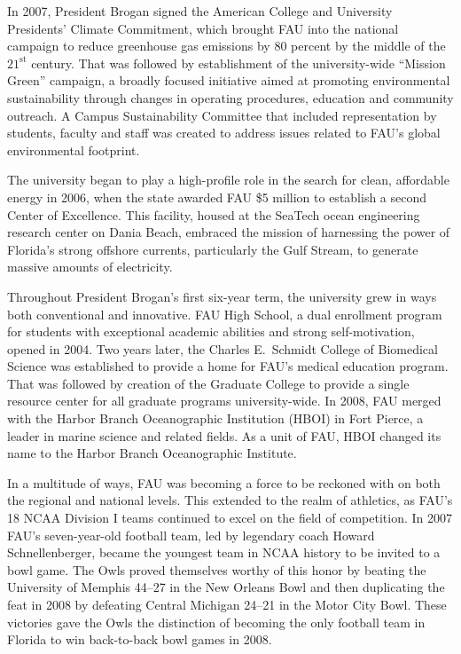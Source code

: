\documentclass{article}
\begin{document}
In 2007, President Brogan signed the American College and University Presidents' Climate Commitment, which brought FAU into the national campaign to reduce greenhouse gas emissions by 80 percent by the middle of the $21^{\mathrm{st}}$ century.  That was followed by establishment of the university-wide ``Mission Green'' campaign, a broadly focused initiative aimed at promoting environmental sustainability through changes in operating procedures, education and community outreach.  A Campus Sustainability Committee that included representation by students, faculty and staff was created to address issues related to FAU's global environmental footprint.

The university began to play a high-profile role in the search for clean, affordable energy in 2006, when the state awarded FAU \$5 million to establish a second Center of Excellence.  This facility, housed at the SeaTech ocean engineering research center on Dania Beach, embraced the mission of harnessing the power of Florida's strong offshore currents, particularly the Gulf Stream, to generate massive amounts of electricity.

Throughout President Brogan's first six-year term, the university grew in ways both conventional and innovative.  FAU High School, a dual enrollment program for students with exceptional academic abilities and strong self-motivation, opened in 2004.  Two years later, the Charles E.\ Schmidt College of Biomedical Science was established to provide a home for FAU's medical education program.  That was followed by creation of the Graduate College to provide a single resource center for all graduate programs university-wide.  In 2008, FAU merged with the Harbor Branch Oceanographic Institution (HBOI) in Fort Pierce, a leader in marine science and related fields.  As a unit of FAU, HBOI changed its name to the Harbor Branch Oceanographic Institute.

In a multitude of ways, FAU was becoming a force to be reckoned with on both the regional and national levels.  This extended to the realm of athletics, as FAU's 18 NCAA Division I teams continued to excel on the field of competition.  In 2007 FAU's seven-year-old football team, led by legendary coach Howard Schnellenberger, became the youngest team in NCAA history to be invited to a bowl game.  The Owls proved themselves worthy of this honor by beating the University of Memphis 44--27 in the New Orleans Bowl and then duplicating the feat in 2008 by defeating Central Michigan 24--21 in the Motor City Bowl.  These victories gave the Owls the distinction of becoming the only football team in Florida to win back-to-back bowl games in 2008.
\end{document}
